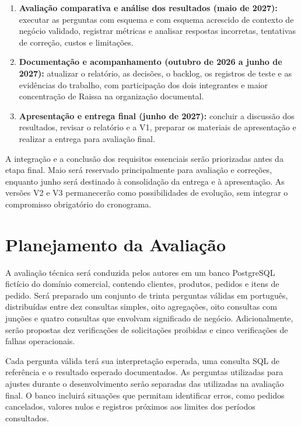 \begin{enumerate}
    \item \textbf{Avaliação comparativa e análise dos resultados (maio de 2027):} executar as perguntas com esquema e com esquema acrescido de contexto de negócio validado, registrar métricas e analisar respostas incorretas, tentativas de correção, custos e limitações.

    \item \textbf{Documentação e acompanhamento (outubro de 2026 a junho de 2027):} atualizar o relatório, as decisões, o backlog, os registros de teste e as evidências do trabalho, com participação dos dois integrantes e maior concentração de Raissa na organização documental.

    \item \textbf{Apresentação e entrega final (junho de 2027):} concluir a discussão dos resultados, revisar o relatório e a V1, preparar os materiais de apresentação e realizar a entrega para avaliação final.
\end{enumerate}

A integração e a conclusão dos requisitos essenciais serão priorizadas antes da etapa final. Maio será reservado principalmente para avaliação e correções, enquanto junho será destinado à consolidação da entrega e à apresentação. As versões V2 e V3 permanecerão como possibilidades de evolução, sem integrar o compromisso obrigatório do cronograma.

\section{Planejamento da Avaliação}

A avaliação técnica será conduzida pelos autores em um banco PostgreSQL fictício do domínio comercial, contendo clientes, produtos, pedidos e itens de pedido. Será preparado um conjunto de trinta perguntas válidas em português, distribuídas entre dez consultas simples, oito agregações, oito consultas com junções e quatro consultas que envolvam significado de negócio. Adicionalmente, serão propostas dez verificações de solicitações proibidas e cinco verificações de falhas operacionais.

Cada pergunta válida terá sua interpretação esperada, uma consulta SQL de referência e o resultado esperado documentados. As perguntas utilizadas para ajustes durante o desenvolvimento serão separadas das utilizadas na avaliação final. O banco incluirá situações que permitam identificar erros, como pedidos cancelados, valores nulos e registros próximos aos limites dos períodos consultados.

